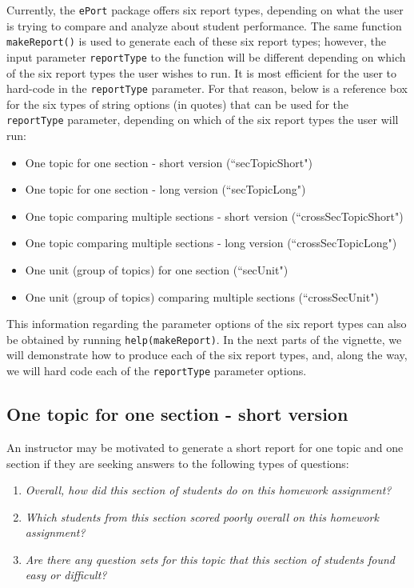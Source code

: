 \documentclass{article}\usepackage[]{graphicx}\usepackage[]{color}
\numberwithin{equation}{section} %
\newcommand{\pkg}[1]{{\texttt{#1}}}
\begin{document}
Currently, the \pkg{ePort} package offers six report types, depending on what the user is trying to compare and analyze about student performance. The same function \texttt{makeReport()} is used to generate each of these six report types; however, the input parameter \texttt{reportType} to the function will be different depending on which of the six report types the user wishes to run. It is most efficient for the user to hard-code in the \texttt{reportType} parameter. For that reason, below is a reference box for the six types of string options (in quotes) that can be used for the \texttt{reportType} parameter, depending on which of the six report types the user will run: 
\begin{framed}
\begin{itemize}
\vspace{-3mm}
\item One topic for one section - short version (``secTopicShort")
\item One topic for one section - long version (``secTopicLong")
\item One topic comparing multiple sections - short version (``crossSecTopicShort")
\item One topic comparing multiple sections - long version (``crossSecTopicLong")
\item One unit (group of topics) for one section (``secUnit")
\item One unit (group of topics) comparing multiple sections (``crossSecUnit")
\end{itemize}
\end{framed}

This information regarding the parameter options of the six report types can also be obtained by running \texttt{help(makeReport)}. In the next parts of the vignette, we will demonstrate how to produce each of the six report types, and, along the way, we will hard code each of the \texttt{reportType} parameter options.

\subsection{One topic for one section - short version}
\label{sec:oneTopicSectionShort}

An instructor may be motivated to generate a short report for one topic and one section if they are seeking answers to the following types of questions:

\begin{enumerate}
\item \textit{Overall, how did this section of students do on this homework assignment?}
\item \textit{Which students from this section scored poorly overall on this homework assignment?}
\item \textit{Are there any question sets for this topic that this section of students found easy or difficult?}
\end{enumerate}
\end{document}
